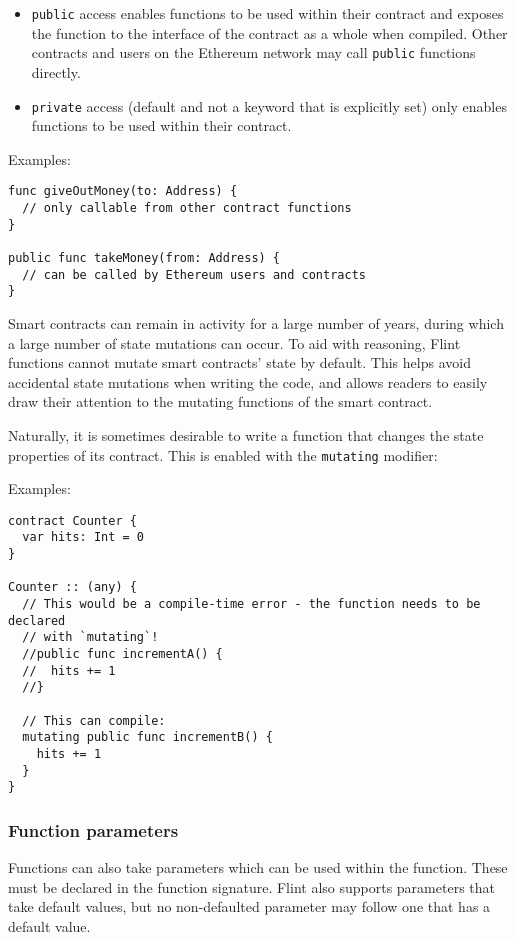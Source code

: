 \begin{itemize}
	\item \texttt{public} access enables functions to be used within their contract and exposes the function to the interface of the contract as a whole when compiled. Other contracts and users on the Ethereum network may call \texttt{public} functions directly.
	\item \texttt{private} access (default and not a keyword that is explicitly set) only enables functions to be used within their contract.
\end{itemize}

Examples:

\begin{verbatim}
func giveOutMoney(to: Address) {
  // only callable from other contract functions
}

public func takeMoney(from: Address) {
  // can be called by Ethereum users and contracts
}
\end{verbatim}

Smart contracts can remain in activity for a large number of years, during which a large number of state mutations can occur. To aid with reasoning, Flint functions cannot mutate smart contracts’ state by default. This helps avoid accidental state mutations when writing the code, and allows readers to easily draw their attention to the mutating functions of the smart contract.

Naturally, it is sometimes desirable to write a function that changes the state properties of its contract. This is enabled with the \texttt{mutating} modifier:

Examples:

\begin{verbatim}
contract Counter {
  var hits: Int = 0
}

Counter :: (any) {
  // This would be a compile-time error - the function needs to be declared
  // with `mutating`!
  //public func incrementA() {
  //  hits += 1
  //}

  // This can compile:
  mutating public func incrementB() {
    hits += 1
  }
}
\end{verbatim}

\subsubsection{Function parameters}
\label{sec:appendix-b-function-parameters}

Functions can also take parameters which can be used within the function. These must be declared in the function signature. Flint also supports parameters that take default values, but no non-defaulted parameter may follow one that has a default value.

